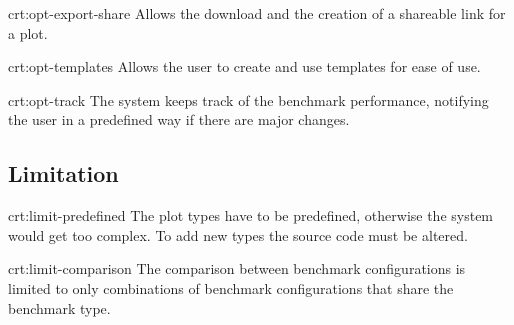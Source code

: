 {crt:opt-export-share}
{Allows the download and the creation of a shareable link for a \gls{plot}.}

{crt:opt-templates}
{Allows the user to create and use \glspl{template} for ease of use.}

{crt:opt-track}
{The system keeps track of the benchmark performance, notifying the user in a predefined way if there are major changes.}


\subsection{Limitation}

{crt:limit-predefined}
{The \gls{plot} types have to be predefined, otherwise the system would get too complex. To add new types the source code must be altered.}

{crt:limit-comparison}
{The comparison between \glspl{benchmark configuration} is limited to only combinations of \glspl{benchmark configuration} that share the \gls{benchmark type}.}
